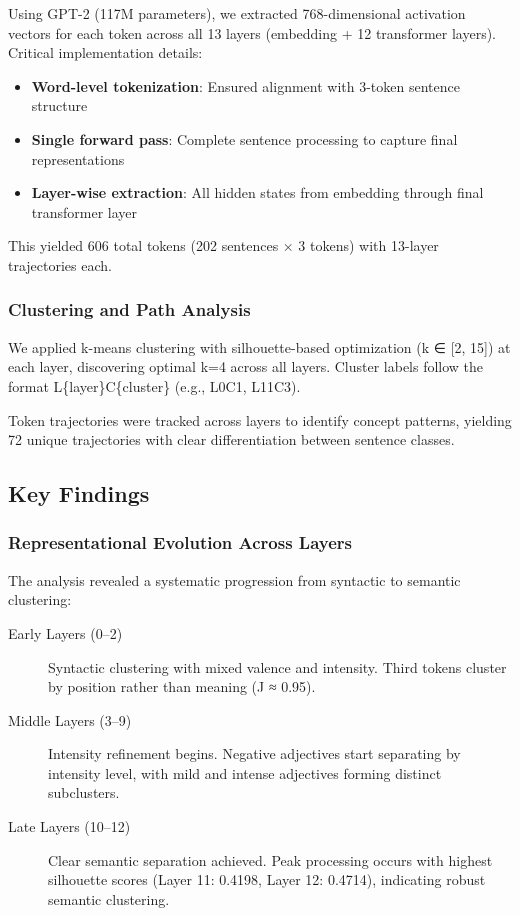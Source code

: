Using GPT-2 (117M parameters), we extracted 768-dimensional activation vectors for each token across all 13 layers (embedding + 12 transformer layers). Critical implementation details:

\begin{itemize}
    \item \textbf{Word-level tokenization}: Ensured alignment with 3-token sentence structure
    \item \textbf{Single forward pass}: Complete sentence processing to capture final representations
    \item \textbf{Layer-wise extraction}: All hidden states from embedding through final transformer layer
\end{itemize}

This yielded 606 total tokens (202 sentences × 3 tokens) with 13-layer trajectories each.

\subsubsection{Clustering and Path Analysis}

We applied k-means clustering with silhouette-based optimization (k ∈ [2, 15]) at each layer, discovering optimal k=4 across all layers. Cluster labels follow the format L\{layer\}C\{cluster\} (e.g., L0C1, L11C3).

Token trajectories were tracked across layers to identify concept patterns, yielding 72 unique trajectories with clear differentiation between sentence classes.

\subsection{Key Findings}

\subsubsection{Representational Evolution Across Layers}

The analysis revealed a systematic progression from syntactic to semantic clustering:

\begin{description}
    \item[Early Layers (0--2)] Syntactic clustering with mixed valence and intensity. Third tokens cluster by position rather than meaning (J ≈ 0.95).
    
    \item[Middle Layers (3--9)] Intensity refinement begins. Negative adjectives start separating by intensity level, with mild and intense adjectives forming distinct subclusters.
    
    \item[Late Layers (10--12)] Clear semantic separation achieved. Peak processing occurs with highest silhouette scores (Layer 11: 0.4198, Layer 12: 0.4714), indicating robust semantic clustering.
\end{description}

